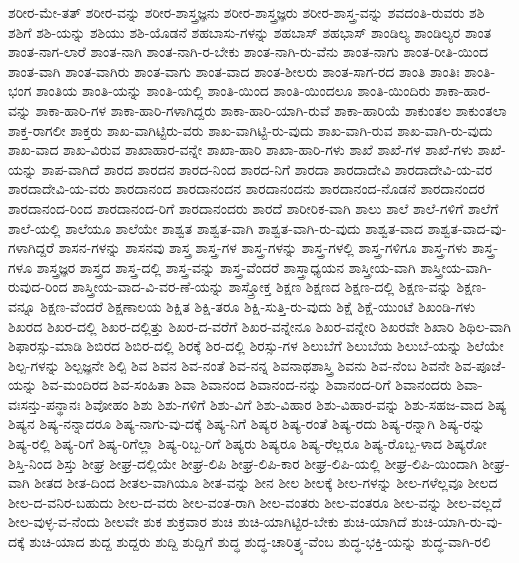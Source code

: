 {ಶರೀರ-ಮೇ-ತತ್
ಶರೀರ-ವನ್ನು
ಶರೀರ-ಶಾಸ್ತ್ರಜ್ಞನು
ಶರೀರ-ಶಾಸ್ತ್ರಜ್ಞರು
ಶರೀರ-ಶಾಸ್ತ್ರ-ವನ್ನು
ಶವದಂತಿ-ರುವರು
ಶಶಿ
ಶಶಿಗೆ
ಶಶಿ-ಯನ್ನು
ಶಶಿಯು
ಶಶಿ-ಯೊಡನೆ
ಶಹಬಾಸು-ಗಳನ್ನು
ಶಹಬಾಸ್
ಶಹಭಾಸ್
ಶಾಂಡಿಲ್ಯ
ಶಾಂಡಿಲ್ಯರ
ಶಾಂತ
ಶಾಂತ-ನಾಗ-ಲಾರೆ
ಶಾಂತ-ನಾಗಿ
ಶಾಂತ-ನಾಗಿ-ರ-ಬೇಕು
ಶಾಂತ-ನಾಗಿ-ರು-ವೆನು
ಶಾಂತ-ನಾಗು
ಶಾಂತ-ರೀತಿ-ಯಿಂದ
ಶಾಂತ-ವಾಗಿ
ಶಾಂತ-ವಾಗಿರು
ಶಾಂತ-ವಾಗು
ಶಾಂತ-ವಾದ
ಶಾಂತ-ಶೀಲರು
ಶಾಂತ-ಸಾಗ-ರದ
ಶಾಂತಿ
ಶಾಂತಿಃ
ಶಾಂತಿ-ಭಂಗ
ಶಾಂತಿಯ
ಶಾಂತಿ-ಯನ್ನು
ಶಾಂತಿ-ಯಲ್ಲಿ
ಶಾಂತಿ-ಯಿಂದ
ಶಾಂತಿ-ಯಿಂದಲೂ
ಶಾಂತಿ-ಯಿಂದಿರು
ಶಾಕಾ-ಹಾರ-ವನ್ನು
ಶಾಕಾ-ಹಾರಿ-ಗಳ
ಶಾಕಾ-ಹಾರಿ-ಗಳಾಗಿದ್ದರು
ಶಾಕಾ-ಹಾರಿ-ಯಾಗಿ-ರುವೆ
ಶಾಕಾ-ಹಾರಿಯೆ
ಶಾಕುಂತಲ
ಶಾಕುಂತಲಾ
ಶಾಕ್ತ-ರಾಗಲೀ
ಶಾಕ್ತರು
ಶಾಖ-ವಾಗಿಟ್ಟಿರು-ವರು
ಶಾಖ-ವಾಗಿಟ್ಟಿ-ರು-ವುದು
ಶಾಖ-ವಾಗಿ-ರುವ
ಶಾಖ-ವಾಗಿ-ರು-ವುದು
ಶಾಖ-ವಾದ
ಶಾಖ-ವಿರುವ
ಶಾಖಾಹಾರ-ವನ್ನೇ
ಶಾಖಾ-ಹಾರಿ
ಶಾಖಾ-ಹಾರಿ-ಗಳು
ಶಾಖೆ
ಶಾಖೆ-ಗಳ
ಶಾಖೆ-ಗಳು
ಶಾಖೆ-ಯನ್ನು
ಶಾಪ-ವಾಗಿದೆ
ಶಾರದ
ಶಾರದನ
ಶಾರದ-ನಿಂದ
ಶಾರದ-ನಿಗೆ
ಶಾರದಾ
ಶಾರದಾದೇವಿ
ಶಾರದಾದೇವಿ-ಯ-ವರ
ಶಾರದಾದೇವಿ-ಯ-ವರು
ಶಾರದಾನಂದ
ಶಾರದಾನಂದನ
ಶಾರದಾನಂದನು
ಶಾರದಾನಂದ-ನೊಡನೆ
ಶಾರದಾನಂದರ
ಶಾರದಾನಂದ-ರಿಂದ
ಶಾರದಾನಂದ-ರಿಗೆ
ಶಾರದಾನಂದರು
ಶಾರದೆ
ಶಾರೀರಿಕ-ವಾಗಿ
ಶಾಲು
ಶಾಲೆ
ಶಾಲೆ-ಗಳಿಗೆ
ಶಾಲೆಗೆ
ಶಾಲೆ-ಯಲ್ಲಿ
ಶಾಲೆಯೂ
ಶಾಲೆಯೇ
ಶಾಶ್ವತ
ಶಾಶ್ವತ-ವಾಗಿ
ಶಾಶ್ವತ-ವಾಗಿ-ರು-ವುದು
ಶಾಶ್ವತ-ವಾದ
ಶಾಶ್ವತ-ವಾದ-ವು-ಗಳಾಗಿದ್ದರೆ
ಶಾಸನ-ಗಳನ್ನು
ಶಾಸನವು
ಶಾಸ್ತ್ರ
ಶಾಸ್ತ್ರ-ಗಳ
ಶಾಸ್ತ್ರ-ಗಳನ್ನು
ಶಾಸ್ತ್ರ-ಗಳಲ್ಲಿ
ಶಾಸ್ತ್ರ-ಗಳಿಗೂ
ಶಾಸ್ತ್ರ-ಗಳು
ಶಾಸ್ತ್ರ-ಗಳೂ
ಶಾಸ್ತ್ರಜ್ಞರ
ಶಾಸ್ತ್ರದ
ಶಾಸ್ತ್ರ-ದಲ್ಲಿ
ಶಾಸ್ತ್ರ-ವನ್ನು
ಶಾಸ್ತ್ರ-ವೆಂದರೆ
ಶಾಸ್ತ್ರಾಧ್ಯಯನ
ಶಾಸ್ತ್ರೀಯ-ವಾಗಿ
ಶಾಸ್ತ್ರೀಯ-ವಾಗಿ-ರುವುದ-ರಿಂದ
ಶಾಸ್ತ್ರೀಯ-ವಾದ-ವಿ-ವರ-ಣೆ-ಯನ್ನು
ಶಾಸ್ತ್ರೋಕ್ತ
ಶಿಕ್ಷಣ
ಶಿಕ್ಷಣದ
ಶಿಕ್ಷಣ-ದಲ್ಲಿ
ಶಿಕ್ಷಣ-ವನ್ನು
ಶಿಕ್ಷಣ-ವನ್ನೂ
ಶಿಕ್ಷಣ-ವೆಂದರೆ
ಶಿಕ್ಷಣಾಲಯ
ಶಿಕ್ಷಿತ
ಶಿಕ್ಷಿ-ತರೂ
ಶಿಕ್ಷಿ-ಸುತ್ತಿ-ರು-ವುದು
ಶಿಕ್ಷೆ
ಶಿಕ್ಷೆ-ಯುಂಟೆ
ಶಿಖಂಡಿ-ಗಳು
ಶಿಖರದ
ಶಿಖರ-ದಲ್ಲಿ
ಶಿಖರ-ದಲ್ಲಿತ್ತು
ಶಿಖರ-ದ-ವರೆಗೆ
ಶಿಖರ-ವನ್ನೇನೂ
ಶಿಖರ-ವನ್ನೇರಿ
ಶಿಖರವೇ
ಶಿಖಾರಿ
ಶಿಥಿಲ-ವಾಗಿ
ಶಿಫಾರಸ್ಸು-ಮಾಡಿ
ಶಿಬಿರದ
ಶಿಬಿರ-ದಲ್ಲಿ
ಶಿರಕ್ಕೆ
ಶಿರ-ದಲ್ಲಿ
ಶಿರಸ್ಸು-ಗಳ
ಶಿಲುಬೆಗೆ
ಶಿಲುಬೆಯ
ಶಿಲುಬೆ-ಯನ್ನು
ಶಿಲೆಯೇ
ಶಿಲ್ಪ-ಗಳನ್ನು
ಶಿಲ್ಪಜ್ಞನೇ
ಶಿಲ್ಪಿ
ಶಿವ
ಶಿವನ
ಶಿವ-ನಂತೆ
ಶಿವ-ನನ್ನ
ಶಿವನಾಥಶಾಸ್ತ್ರಿ
ಶಿವನು
ಶಿವ-ನೆಂಬ
ಶಿವನೇ
ಶಿವ-ಪೂಜೆ-ಯನ್ನು
ಶಿವ-ಮಂದಿರದ
ಶಿವ-ಸಂಹಿತಾ
ಶಿವಾ
ಶಿವಾನಂದ
ಶಿವಾನಂದ-ನನ್ನು
ಶಿವಾನಂದ-ರಿಗೆ
ಶಿವಾನಂದರು
ಶಿವಾ-ವಃಸನ್ತು-ಪನ್ಥಾನಃ
ಶಿವೋಹಂ
ಶಿಶು
ಶಿಶು-ಗಳಿಗೆ
ಶಿಶು-ವಿಗೆ
ಶಿಶು-ವಿಹಾರ
ಶಿಶು-ವಿಹಾರ-ವನ್ನು
ಶಿಶು-ಸಹಜ-ವಾದ
ಶಿಷ್ಯ
ಶಿಷ್ಯನ
ಶಿಷ್ಯ-ನನ್ನಾದರೂ
ಶಿಷ್ಯ-ನಾಗು-ವು-ದಕ್ಕೆ
ಶಿಷ್ಯ-ನಿಗೆ
ಶಿಷ್ಯರ
ಶಿಷ್ಯ-ರಂತೆ
ಶಿಷ್ಯ-ರದು
ಶಿಷ್ಯ-ರನ್ನಾಗಿ
ಶಿಷ್ಯ-ರನ್ನು
ಶಿಷ್ಯ-ರಲ್ಲಿ
ಶಿಷ್ಯ-ರಿಗೆ
ಶಿಷ್ಯ-ರಿಗೆಲ್ಲಾ
ಶಿಷ್ಯ-ರಿಬ್ಬ-ರಿಗೆ
ಶಿಷ್ಯರು
ಶಿಷ್ಯರೂ
ಶಿಷ್ಯ-ರೆಲ್ಲರೂ
ಶಿಷ್ಯ-ರೊಬ್ಬ-ಳಾದ
ಶಿಷ್ಯರೋ
ಶಿಸ್ತಿ-ನಿಂದ
ಶಿಸ್ತು
ಶೀಘ್ರ
ಶೀಘ್ರ-ದಲ್ಲಿಯೇ
ಶೀಘ್ರ-ಲಿಪಿ
ಶೀಘ್ರ-ಲಿಪಿ-ಕಾರ
ಶೀಘ್ರ-ಲಿಪಿ-ಯಲ್ಲಿ
ಶೀಘ್ರ-ಲಿಪಿ-ಯಿಂದಾಗಿ
ಶೀಘ್ರ-ವಾಗಿ
ಶೀತದ
ಶೀತ-ದಿಂದ
ಶೀತಲ-ವಾಗಿಯೂ
ಶೀತ-ವನ್ನು
ಶೀನ
ಶೀಲ
ಶೀಲಕ್ಕೆ
ಶೀಲ-ಗಳನ್ನು
ಶೀಲ-ಗಳೆಲ್ಲವೂ
ಶೀಲದ
ಶೀಲ-ದ-ವನಿರ-ಬಹುದು
ಶೀಲ-ದ-ವರು
ಶೀಲ-ವಂತ-ರಾಗಿ
ಶೀಲ-ವಂತರು
ಶೀಲ-ವಂತರೂ
ಶೀಲ-ವನ್ನು
ಶೀಲ-ವಲ್ಲದೆ
ಶೀಲ-ವುಳ್ಳ-ವ-ನೆಂದು
ಶೀಲವೇ
ಶುಕ
ಶುಕ್ರವಾರ
ಶುಚಿ
ಶುಚಿ-ಯಾಗಿಟ್ಟಿರ-ಬೇಕು
ಶುಚಿ-ಯಾಗಿದೆ
ಶುಚಿ-ಯಾಗಿ-ರು-ವು-ದಕ್ಕೆ
ಶುಚಿ-ಯಾದ
ಶುದ್ದ
ಶುದ್ದರು
ಶುದ್ದಿ
ಶುದ್ದಿಗೆ
ಶುದ್ಧ
ಶುದ್ಧ-ಚಾರಿತ್ರ್ಯ-ವೆಂಬ
ಶುದ್ಧ-ಭಕ್ತಿ-ಯನ್ನು
ಶುದ್ಧ-ವಾಗಿ-ರಲಿ
}
